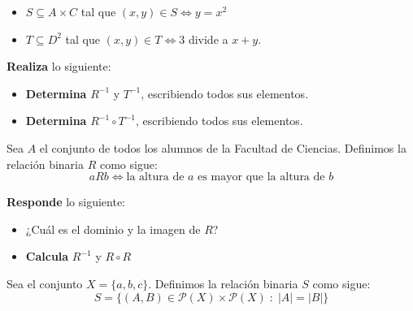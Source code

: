 \documentclass[oneside]{style}
\begin{document}
\begin{questions}[label=\protect\circled{\bfseries\arabic*}]
{\begin{itemize}
            \item $S \subseteq A \times C$ tal que $(x,y) \in S 
            \Leftrightarrow y = x^2$

            \item $T \subseteq D^2$ tal que $(x,y) \in T \Leftrightarrow
            3$ divide a $x+y$. 
        \end{itemize}

        \textbf{Realiza} lo siguiente:
        \begin{itemize}
            \item \textbf{Determina} $R^{-1}$ y $T^{-1}$, escribiendo todos 
            sus elementos.

            \item \textbf{Determina} $R^{-1} \circ T^{-1}$, escribiendo todos 
            sus elementos. 
        \end{itemize}
    }



    \question
    {
        Sea $A$ el conjunto de todos los alumnos de la Facultad de Ciencias. 
        Definimos la relación binaria $R$ como sigue:
        \begin{equation*}
            a R b \Leftrightarrow \text{la altura de } a \text{ es mayor que 
            la altura de } b
        \end{equation*}

        \textbf{Responde} lo siguiente:
        \begin{itemize}
            \item ¿Cuál es el dominio y la imagen de $R$?
            \item \textbf{Calcula} $R^{-1}$ y $R \circ R$
        \end{itemize}
    }

    \question
    {
        Sea el conjunto $X = \{a,b,c\}$. Definimos la relación binaria $S$ 
        como sigue:
        \begin{equation*}
            S = \{(A, B) \in \mathcal{P}(X) \times \mathcal{P}(X) \; : \; 
            |A| = |B|\}
        \end{equation*}

}
\end{questions}
\end{document}
